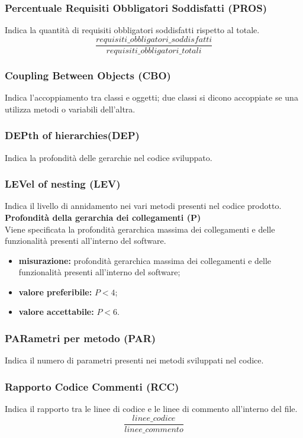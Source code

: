 \subsubsection{Percentuale Requisiti Obbligatori Soddisfatti (PROS)}
Indica la quantità di requisiti obbligatori soddisfatti rispetto al totale.
\[\frac{requisiti\_obbligatori\_soddisfatti}{requisiti\_obbligatori\_totali}\]

\subsubsection{Coupling Between Objects (CBO)}
Indica l'accoppiamento tra classi e oggetti; due classi si dicono accoppiate se una utilizza metodi o variabili dell'altra.

\subsubsection{DEPth of hierarchies(DEP)}
Indica la profondità delle gerarchie nel codice sviluppato.

\subsubsection{LEVel of nesting (LEV)}
Indica il livello di annidamento nei vari metodi presenti nel codice prodotto.
\textbf{Profondità della gerarchia dei collegamenti (P)}\\
Viene specificata la profondità gerarchica massima dei collegamenti e delle funzionalità presenti all'interno del software.
\begin{itemize}
	\item \textbf{misurazione:} profondità gerarchica massima dei collegamenti e delle funzionalità presenti all'interno del software;
	\item \textbf{valore preferibile:} $P < 4$;
	\item \textbf{valore accettabile:} $P < 6$.
\end{itemize}

\subsubsection{PARametri per metodo (PAR)}
Indica il numero di parametri presenti nei metodi sviluppati nel codice.

\subsubsection{Rapporto Codice Commenti (RCC)}
Indica il rapporto tra le linee di codice e le linee di commento all'interno del file.
\[\frac{linee\_codice}{linee\_commento}\]

